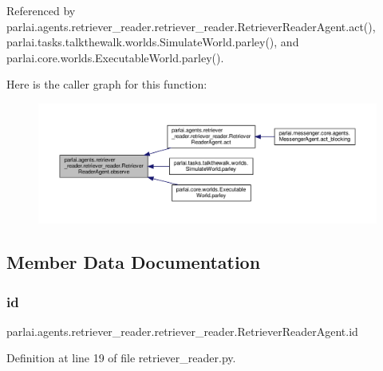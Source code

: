 Referenced by parlai.\+agents.\+retriever\+\_\+reader.\+retriever\+\_\+reader.\+Retriever\+Reader\+Agent.\+act(), parlai.\+tasks.\+talkthewalk.\+worlds.\+Simulate\+World.\+parley(), and parlai.\+core.\+worlds.\+Executable\+World.\+parley().

Here is the caller graph for this function\+:
\nopagebreak
\begin{figure}[H]
\begin{center}
\leavevmode
\includegraphics[width=350pt]{classparlai_1_1agents_1_1retriever__reader_1_1retriever__reader_1_1RetrieverReaderAgent_a093b0a679a2cc8a09ed3a4ae314362b1_icgraph}
\end{center}
\end{figure}


\subsection{Member Data Documentation}
\mbox{\label{classparlai_1_1agents_1_1retriever__reader_1_1retriever__reader_1_1RetrieverReaderAgent_ad509b6894625808427a677995488c385}} 
\subsubsection{\texorpdfstring{id}{id}}
{\footnotesize\ttfamily parlai.\+agents.\+retriever\+\_\+reader.\+retriever\+\_\+reader.\+Retriever\+Reader\+Agent.\+id}



Definition at line 19 of file retriever\+\_\+reader.\+py.




